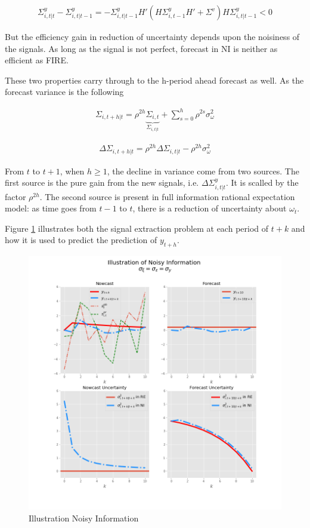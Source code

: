 \documentclass[]{article}
\begin{document}
\begin{eqnarray}
\Sigma^y_{i,t|t} - \Sigma^y_{i,t|t-1} = - \Sigma^y_{i,t|t-1} H'(H \Sigma^y_{i,t-1} H' +\Sigma^v) H \Sigma^y_{i,t|t-1} <0
\end{eqnarray}

But the efficiency gain in reduction of uncertainty depends upon the noisiness of the signals. As long as the signal is not perfect, forecast in NI is neither as efficient as FIRE. 

These two properties carry through to the h-period ahead forecast as well. As the forecast variance is the following 

\begin{eqnarray}
\Sigma_{i,t+h|t} = \rho^{2h} \underbrace{\Sigma_{i,t}}_{\Sigma_{i,t|t}} + \sum^{h}_{s=0}\rho^{2s} \sigma^2_{\omega}
\end{eqnarray}


\begin{eqnarray}
\Delta \Sigma_{i,t+h|t} = \rho^{2h}\Delta  \Sigma_{i,t|t}  - \rho^{2h} \sigma^2_{\omega}
\end{eqnarray}

From $t$ to $t+1$, when $h\geq 1$, the decline in variance come from two sources. The first source is the pure gain from the new signals, i.e. $\Delta \Sigma^y_{i,t|t}$. It is scalled by the factor $\rho^{2h}$. The second source is present in full information rational expectation model: as time goes from $t-1$ to $t$, there is a reduction of uncertainty about $\omega_t$.

Figure \ref{IllustrateNI} illustrates both the signal extraction problem at each period of $t+k$ and how it is used to predict the prediction of $y_{t+h}$. 


\begin{figure}[h]\label{IllustrateNI}
	\centering
	\includegraphics[width=13cm]{figures/ni_illustration.png}  
	\caption{Illustration Noisy Information}
\end{figure}
\end{document}
